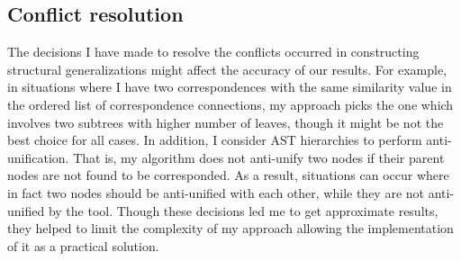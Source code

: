 \subsection{Conflict resolution}  \label{conflicts} 
The decisions I have made to resolve the conflicts occurred in constructing structural generalizations might affect the accuracy of our results.
For example, in situations where I have two correspondences with the same similarity value in the ordered list of correspondence connections, my approach picks the one which involves two subtrees with higher number of leaves, though it might be not the best choice for all cases. 
In addition, I consider AST hierarchies to perform anti-unification. That is, my algorithm does not anti-unify two nodes if their parent nodes are not found to be corresponded. As a result, situations can occur where in fact two nodes should be anti-unified with each other, while they are not anti-unified by the tool. Though these decisions led me to get approximate results, they helped to limit the complexity of my approach allowing the implementation of it as a practical solution.




